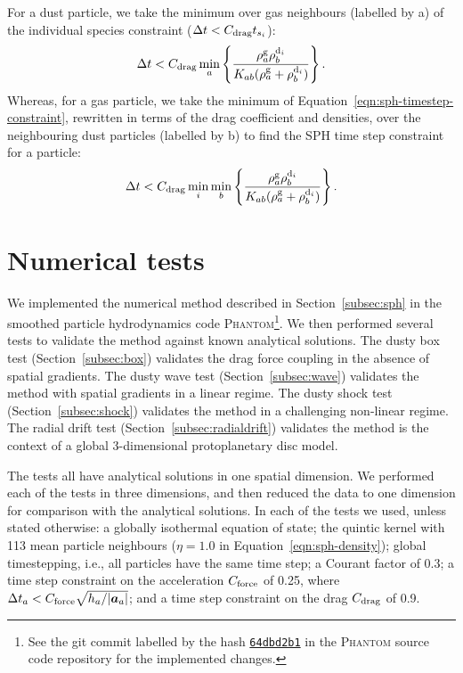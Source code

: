 \documentclass[fleqn,usenatbib]{mnras}
\newcommand{\g}{\mathrm{g}}
\newcommand{\dd}{\mathrm{d}}
\let\vec\bm
\begin{document}
For a dust particle, we take the minimum over gas neighbours (labelled by a) of
the individual species constraint (\(\Delta t < C_{\rm drag} t_{s_i}\)):
%
\begin{align}
   \Delta t < C_{\rm drag} \min_{a}
   \left\{ \frac{\rho^{\g}_a \rho^{\dd_i}_b}{K_{ab} (\rho^{\g}_a + \rho^{\dd_i}_b)} \right\}.
\end{align}
%
Whereas, for a gas particle, we take the minimum of
Equation~\ref{eqn:sph-timestep-constraint}, rewritten in terms of the drag
coefficient and densities, over the neighbouring dust particles (labelled by b)
to find the SPH time step constraint for a particle:
%
\begin{align}
   \Delta t < C_{\rm drag} \min_i \min_{b}
   \left\{ \frac{\rho^{\g}_a \rho^{\dd_i}_b}{K_{ab} (\rho^{\g}_a + \rho^{\dd_i}_b)} \right\}.
\end{align}


\section{Numerical tests}%
\label{sec:tests}

We implemented the numerical method described in Section~\ref{subsec:sph} in the
smoothed particle hydrodynamics code \textsc{Phantom}\footnote{See the git
commit labelled by the hash
\href{https://github.com/danieljprice/phantom/commit/64dbd2b124ca74051eed920d6cad0a2e83157478}{\texttt{64dbd2b1}}
in the \textsc{Phantom} source code repository for the implemented changes.}. We
then performed several tests to validate the method against known analytical
solutions. The dusty box test (Section~\ref{subsec:box}) validates the drag
force coupling in the absence of spatial gradients. The dusty wave test
(Section~\ref{subsec:wave}) validates the method with spatial gradients in a
linear regime. The dusty shock test (Section~\ref{subsec:shock}) validates the
method in a challenging non-linear regime. The radial drift test
(Section~\ref{subsec:radialdrift}) validates the method is the context of a
global 3-dimensional protoplanetary disc model.

The tests all have analytical solutions in one spatial dimension. We performed
each of the tests in three dimensions, and then reduced the data to one
dimension for comparison with the analytical solutions. In each of the tests we
used, unless stated otherwise: a globally isothermal equation of state; the
quintic kernel with 113 mean particle neighbours (\(\eta = 1.0\) in
Equation~\ref{eqn:sph-density}); global timestepping, i.e., all particles have
the same time step; a Courant factor of 0.3; a time step constraint on the
acceleration \( C_{\rm force} \) of 0.25, where \(\Delta t_a < C_{\rm force}
\sqrt{h_a / |\vec{a}_a|} \); and a time step constraint on the drag \(C_{\rm
drag}\) of 0.9.
\end{document}
